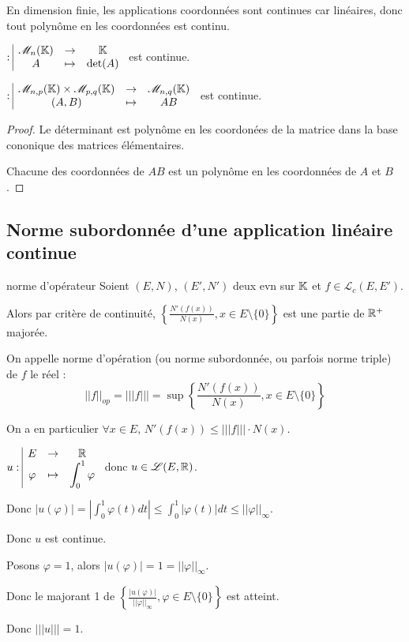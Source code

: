 
En dimension finie, les applications coordonnées sont continues car linéaires, donc 
tout polynôme en les coordonnées est continu. 


\avspace $: \space \begin{array}{|ccc} \displaystyle \mathscr M_n(\mathbb{K}) & \to & \displaystyle \mathbb{K} \\ \displaystyle A & \mapsto & \displaystyle \det(A) \end{array}$ est continue.

$: \space \begin{array}{|ccc} \displaystyle \mathscr M_{n, p}(\mathbb{K}) \times \mathscr M_{p, q}(\mathbb{K}) & \to & \displaystyle \mathscr M_{n, q}(\mathbb{K}) \\ \displaystyle (A, B) & \mapsto & \displaystyle AB \end{array}$ est continue.

\begin{proof}
    Le déterminant est polynôme en les coordonées de la matrice dans la base cononique des 
    matrices élémentaires. 

    \svspace Chacune des coordonnées de $AB$ est un polynôme en les coordonnées de $A$ et $B$.
\end{proof}


\subsection{Norme subordonnée d'une application linéaire continue }

\begin{definition}{norme d'opérateur}{}
    Soient $(E, N)$, $(E', N')$ deux evn sur $\mathbb{K}$ et $f \in \mathscr L_c(E, E')$.

    Alors par critère de continuité, $\left\{ \frac{N'(f(x))}{N(x)}, x \in E \setminus \{0\} \right\}$ est
    une partie de $\mathbb{R}^+$ majorée. 

    On appelle norme d'opération (ou norme subordonnée, ou parfois norme triple) de $f$ le réel : 
    $$||f||_{op} = |||f||| = \sup \left\{ \frac{N'(f(x))}{N(x)}, x \in E \setminus \{0\} \right\} $$ 


    On a en particulier $\forall x \in E, \, N'(f(x)) \leqslant |||f||| \cdot N(x)$.
\end{definition}


\begin{exemple}
    $u: \space \begin{array}{|ccc} \displaystyle E & \to & \displaystyle \mathbb{R} \\ \displaystyle \varphi & \mapsto & \displaystyle \int_0^1 \varphi \end{array}$ donc $u \in \mathscr L(E, \mathbb{R})$. 

    Donc $|u(\varphi)| = \left| \int_0^1 \varphi(t) dt \right| \leqslant \int_0^1 |\varphi(t)| dt \leqslant ||\varphi||_\infty$.

    Donc $u$ est continue. 

    Posons $\varphi = 1$, alors $|u(\varphi)| = 1 = ||\varphi||_\infty$.

    Donc le majorant 1 de $\left\{ \frac{|u(\varphi)|}{||\varphi||_\infty}, \varphi \in E \setminus \{0\} \right\}$ est atteint. 

    Donc $|||u||| = 1$.
\end{exemple}


